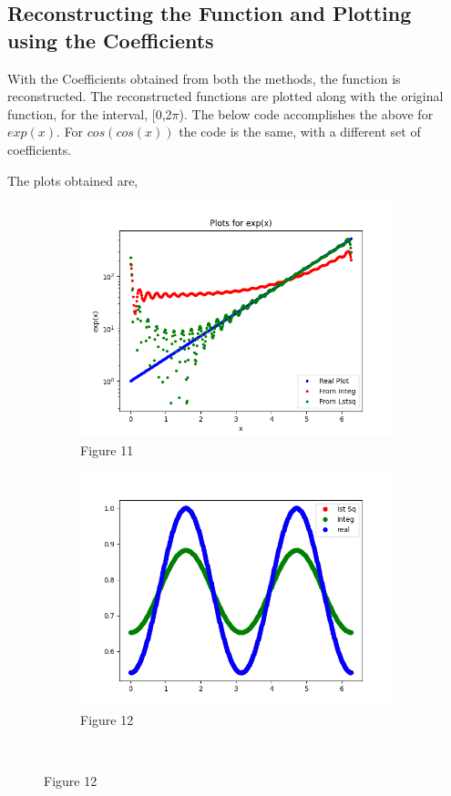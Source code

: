 \documentclass[12pt, a4paper]{report}
\begin{document}
\subsection{Reconstructing the Function and Plotting using the Coefficients}
With the Coefficients obtained from both the methods, the function is reconstructed. The reconstructed functions are plotted along with the original function, for the interval, [0,2$\pi$). The below code accomplishes the above for $exp(x)$. For $cos(cos(x))$ the code is the same, with a different set of coefficients.
\
\noindent

\vspace{4mm}
The plots obtained are,
\begin{figure}[t]

\begin{subfigure}{0.55\textwidth}
    \centering
    \includegraphics[scale=0.5,width=\linewidth]{fig11.png} 
    \caption{Figure 11}
    \label{fig:my_label}
\end{subfigure}
\begin{subfigure}{0.55\textwidth}
    \centering
    \includegraphics[scale=0.5,width=\linewidth]{fig12.png} 
    \caption{Figure 12}
    \label{fig:image2}
\end{subfigure}
\


\end{figure}
\end{document}
